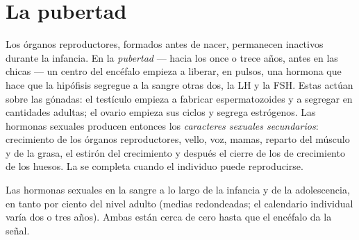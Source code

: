 \section{La pubertad}

\begin{proposition}[La pubertad]\label{prop:g11:becoming-male-female:puberty}
Los órganos reproductores, formados antes de nacer, permanecen
inactivos durante la infancia. En la \emph{pubertad}
--- hacia los once o trece años, antes en las chicas --- un centro del
encéfalo empieza a liberar, en pulsos, una hormona que hace que la
hipófisis segregue a la sangre otras dos, la LH y la FSH. Estas actúan
sobre las gónadas: el testículo empieza a fabricar espermatozoides y a
segregar  en cantidades adultas; el ovario empieza sus
ciclos y segrega estrógenos. Las hormonas sexuales producen entonces
los \emph{caracteres sexuales secundarios}: crecimiento de los órganos
reproductores, vello, voz, mamas, reparto del músculo y de la grasa, el
estirón del crecimiento y después el cierre de los  de
crecimiento de los huesos. La  se completa cuando el individuo
puede reproducirse.
\end{proposition}
\admitted

\begin{omfigure}

{\small Las hormonas sexuales en la sangre a lo largo de la infancia y
de la adolescencia, en tanto por ciento del nivel adulto (medias
redondeadas; el calendario individual varía dos o tres años). Ambas
están cerca de cero hasta que el encéfalo da la señal.}
\end{omfigure}

